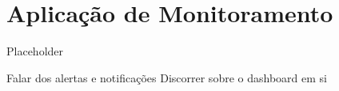 

\section{Aplicação de Monitoramento}

Placeholder

Falar dos alertas e notificações
Discorrer sobre o dashboard em si



